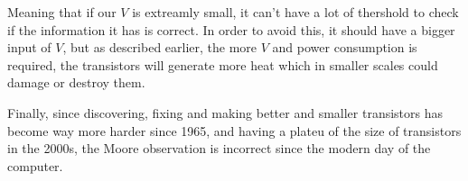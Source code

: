 \documentclass{article}
\begin{document}
Meaning that if our $V$ is extreamly small, it can't have a lot of thershold to check if the information it has is correct.
In order to avoid this, it should have a bigger input of $V$, but as described earlier, the more $V$ and power consumption 
is required, the transistors will generate more heat which in smaller scales could damage or destroy them.


Finally, since discovering, fixing and making better and smaller transistors has become way more harder since 1965, and having a 
plateu of the size of transistors in the 2000s, the Moore observation is incorrect since the modern day of the computer.
\end{document}
